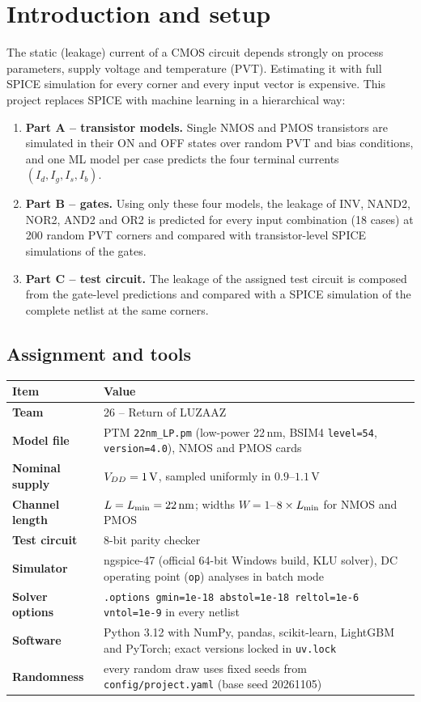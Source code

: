 \section{Introduction and setup}\label{sec:setup}

The static (leakage) current of a CMOS circuit depends strongly on process parameters, supply voltage and temperature (PVT). Estimating it with
full SPICE simulation for every corner and every input vector is expensive. This project replaces SPICE with machine learning in a hierarchical way:
\begin{enumerate}
  \item \textbf{Part A -- transistor models.} Single NMOS and PMOS transistors are simulated in their ON and OFF states over random PVT and bias
        conditions, and one ML model per case predicts the four terminal currents $(I_d, I_g, I_s, I_b)$.
  \item \textbf{Part B -- gates.} Using only these four models, the leakage of INV, NAND2, NOR2, AND2 and OR2 is predicted for every input combination
        (18 cases) at 200 random PVT corners and compared with transistor-level SPICE simulations of the gates.
  \item \textbf{Part C -- test circuit.} The leakage of the assigned test circuit is composed from the gate-level predictions and compared with a SPICE
        simulation of the complete netlist at the same corners.
\end{enumerate}

\subsection{Assignment and tools}
\begin{center}\small
\begin{tabular}{>{\bfseries}l p{}}
\toprule
Item & Value\\
\midrule
Team & 26 -- Return of LUZAAZ\\
Model file & PTM \texttt{22nm\_LP.pm} (low-power 22\,nm, BSIM4 \texttt{level=54}, \texttt{version=4.0}), NMOS and PMOS cards\\
Nominal supply & $V_{DD}=1\,\mathrm{V}$, sampled uniformly in $0.9$--$1.1\,\mathrm{V}$\\
Channel length & $L=L_{\min}=22\,\mathrm{nm}$; widths $W=1$--$8\times L_{\min}$ for NMOS and PMOS\\
Test circuit & 8-bit parity checker\\
Simulator & ngspice-47 (official 64-bit Windows build, KLU solver), DC operating point (\texttt{op}) analyses in batch mode\\
Solver options & \texttt{.options gmin=1e-18 abstol=1e-18 reltol=1e-6 vntol=1e-9} in every netlist\\
Software & Python 3.12 with NumPy, pandas, scikit-learn, LightGBM and PyTorch; exact versions locked in \texttt{uv.lock}\\
Randomness & every random draw uses fixed seeds from \texttt{config/project.yaml} (base seed 20261105)\\
\bottomrule
\end{tabular}
\end{center}

